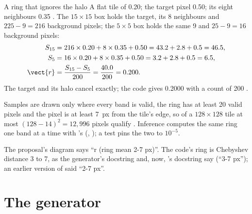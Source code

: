 \begin{worked}[label={we:namer:ring}]{A ring that ignores the halo}
A flat tile of 0.20; the target pixel 0.50; its eight neighbours 0.35 \tagA. The $15\times15$ box holds the
target, its 8 neighbours and $225-9=216$ background pixels; the $5\times5$ box holds the same 9 and $25-9=16$
background pixels:
\begin{align*}
S_{15} &= 216\times0.20+8\times0.35+0.50 = 43.2+2.8+0.5 = 46.5,\\
S_{5} &= 16\times0.20+8\times0.35+0.50 = 3.2+2.8+0.5 = 6.5,\\
\vect{r} &= \frac{S_{15}-S_5}{200} = \frac{40.0}{200} = 0.200 .
\end{align*}
The target and its halo cancel exactly; the code gives 0.2000 with a count of 200 \tagC.
\end{worked}

Samples are drawn only where every band is valid, the ring has at least 20 valid pixels and the pixel is at least
7~px from the tile's edge, so of a $128\times128$ tile at most $(128-14)^2=12{,}996$ pixels qualify \tagC. Inference
computes the same ring one band at a time with 's  (,
); a test pins the two to $10^{-5}$.

\begin{sourcenote}
The proposal's diagram says ``r (ring mean 2-7 px)''. The code's ring is Chebyshev distance 3 to 7, as the
generator's docstring and, now, 's docstring say (``3-7 px''); an earlier version of 
said ``2-7 px''.
\end{sourcenote}

\section{The generator}\label{sec:namer:generator}

